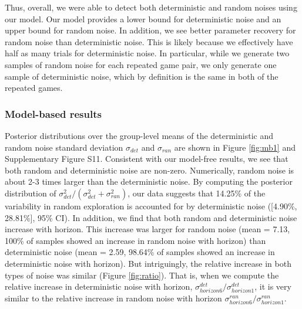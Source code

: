 \documentclass[12pt]{article}
\begin{document}
{Thus, overall, we were able to detect both deterministic and random noises using our model. Our model provides a lower bound for deterministic noise and an upper bound for random noise. In addition, we see better parameter recovery for random noise than deterministic noise. This is likely because we effectively have half as many trials for deterministic noise. In particular, while we generate two samples of random noise for each repeated game pair, we only generate one sample of deterministic noise, which by definition is the same in both of the repeated games. 


\subsubsection*{Model-based results} 
Posterior distributions over the group-level means of the deterministic and random noise standard deviation $\sigma_{det}$ and $\sigma_{ran}$ are shown in Figure \ref{fig:mb1} and Supplementary Figure S11. Consistent with our model-free results, we see that both random and deterministic noise are non-zero. Numerically, random noise is about 2-3 times larger than the deterministic noise. By computing the posterior distribution of $\sigma^2_{det}/(\sigma^2_{det}+\sigma^2_{ran})$, our data suggests that 14.25\% of the variability in random exploration is accounted for by deterministic noise ([4.90\%, 28.81\%], 95\% CI). In addition, we find that both random and deterministic noise increase with horizon. This increase was larger for random noise (mean = 7.13, 100\% of samples showed an increase in random noise with horizon) than deterministic noise (mean = 2.59, 98.64\% of samples showed an increase in deterministic noise with horizon). But intriguingly, the relative increase in both types of noise was similar (Figure \ref{fig:ratio}). That is, when we compute the relative increase in deterministic noise with horizon, $\sigma^{det}_{horizon6}/\sigma^{det}_{horizon1}$, it is very similar to the relative increase in random noise with horizon $\sigma^{ran}_{horizon6}/\sigma^{ran}_{horizon1}$. 

}
\end{document}
